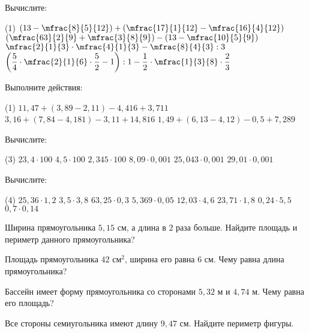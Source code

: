 \begin{class}[number=8]
	\begin{listofex}
		\item Вычислите: 
		\begin{tasks}(1)
			\task \( \left( 13-\mfrac{8}{5}{12} \right)+\left( \mfrac{17}{1}{12}-\mfrac{16}{4}{12} \right) \)
			\task \( \left( \mfrac{63}{2}{9}+\mfrac{3}{8}{9} \right)-\left( 13-\mfrac{10}{5}{9} \right) \)
			\task \( \mfrac{2}{1}{3}\cdot\mfrac{4}{1}{3}-\mfrac{8}{4}{3}:3 \)
			\task \( \left( \dfrac{5}{4}\cdot\mfrac{2}{1}{6}\cdot\dfrac{5}{2}-1 \right):1-\dfrac{1}{2}\cdot\mfrac{1}{3}{8}\cdot\dfrac{2}{3} \)
		\end{tasks}
		\item Выполните действия:
		\begin{tasks}(1)
			\task \( 11,47+(3,89-2,11)-4,416+3,711 \)
			\task \( 3,16+(7,84-4,181)-3,11+14,816 \)
			\task \( 1,49+(6,13-4,12)-0,5+7,289 \)
		\end{tasks}
		\item Вычислите:
		\begin{tasks}(3)
			\task \( 23,4\cdot100 \)
			\task\( 4,5 \cdot100 \)
			\task \( 2,345\cdot100 \)
			\task\( 8,09\cdot0,001 \) 
			\task\( 25,043 \cdot0,001  \)
			\task\( 29,01\cdot0,001   \)
		\end{tasks}
		\item Вычислите:
		\begin{tasks}(4)
			\task \( 25,36\cdot1,2 \)
			\task \( 3,5\cdot3,8 \)
			\task \( 63,25\cdot0,3 \)
			\task \( 5,369\cdot0,05 \)
			\task \( 12,03\cdot4,6 \)
			\task \( 23,71\cdot1,8 \)
			\task \( 0,24\cdot5,5 \)
			\task \( 0,7\cdot0,14 \)
		\end{tasks}
		\item Ширина прямоугольника \( 5,15 \) см, а длина в \( 2 \) раза больше. Найдите площадь и периметр данного прямоугольника?
		\item Площадь прямоугольника \( 42 \) см\( ^{2} \), ширина его равна \( 6 \) см. Чему равна длина прямоугольника?
		\item Бассейн имеет форму прямоугольника со сторонами \( 5,32 \) м и \( 4,74 \) м. Чему равна его площадь?
		\item Все стороны семиугольника имеют длину \( 9,47 \) см. Найдите периметр фигуры.
	\end{listofex}
\end{class}

